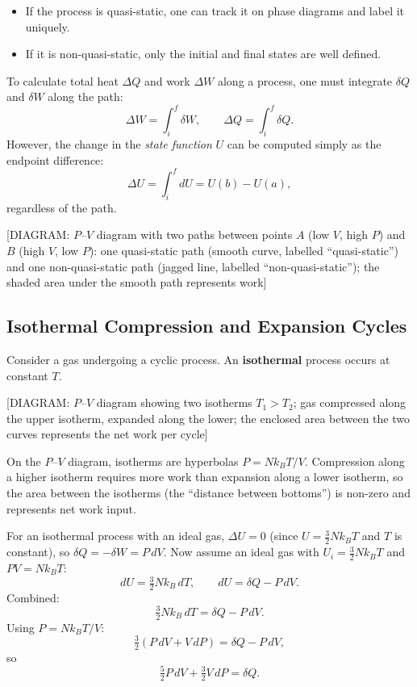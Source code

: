 \begin{itemize}
  \item If the process is quasi-static, one can track it on phase diagrams and label it uniquely.
  \item If it is non-quasi-static, only the initial and final states are well defined.
\end{itemize}

To calculate total heat $\Delta Q$ and work $\Delta W$ along a process, one must integrate
$\delta Q$ and $\delta W$ along the path:
\[
  \Delta W = \int_i^f \delta W, \qquad \Delta Q = \int_i^f \delta Q.
\]
However, the change in the \emph{state function} $U$ can be computed simply as the endpoint
difference:
\[
  \Delta U = \int_i^f dU = U(b) - U(a),
\]
regardless of the path.

\begin{center}
[DIAGRAM: $P$--$V$ diagram with two paths between points $A$ (low $V$, high $P$) and $B$ (high
$V$, low $P$): one quasi-static path (smooth curve, labelled ``quasi-static'') and one non-quasi-static
path (jagged line, labelled ``non-quasi-static''); the shaded area under the smooth path represents work]
\end{center}

\subsection{Isothermal Compression and Expansion Cycles}

Consider a gas undergoing a cyclic process. An \textbf{isothermal} process occurs at constant $T$.

\begin{center}
[DIAGRAM: $P$--$V$ diagram showing two isotherms $T_1 > T_2$; gas compressed along the upper
isotherm, expanded along the lower; the enclosed area between the two curves represents the net
work per cycle]
\end{center}

On the $P$--$V$ diagram, isotherms are hyperbolas $P = Nk_BT/V$. Compression along a higher
isotherm requires more work than expansion along a lower isotherm, so the area between the
isotherms (the ``distance between bottoms'') is non-zero and represents net work input.

For an isothermal process with an ideal gas, $\Delta U = 0$ (since $U = \tfrac{3}{2}Nk_BT$ and
$T$ is constant), so $\delta Q = -\delta W = P\,dV$. Now assume an ideal gas with
$U_i = \tfrac{3}{2}Nk_BT$ and $PV = Nk_BT$:
\[
  dU = \tfrac{3}{2}Nk_B\,dT, \qquad dU = \delta Q - P\,dV.
\]
Combined:
\[
  \tfrac{3}{2}Nk_B\,dT = \delta Q - P\,dV.
\]
Using $P = Nk_BT/V$:
\[
  \tfrac{3}{2}(P\,dV + V\,dP) = \delta Q - P\,dV,
\]
so
\[
  \tfrac{5}{2}P\,dV + \tfrac{3}{2}V\,dP = \delta Q.
\]

